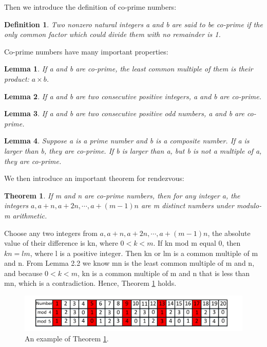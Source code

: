 \documentclass[10pt, conference, letterpaper]{IEEEtran}
\newtheorem{theorem}{Theorem}
\newtheorem{lemma}{Lemma}[section]
\newtheorem{definition}{Definition}[section]
\begin{document}
Then we introduce the definition of co-prime numbers:
\begin{definition}
Two nonzero natural integers a and b are said to be co-prime if the only common factor which could divide them with no remainder is 1.
\end{definition}

Co-prime numbers have many important properties:
\begin{lemma}
If a and b are co-prime, the least common multiple of them is their product: $a \times b$.
\end{lemma}
\begin{lemma}
If a and b are two consecutive positive integers, a and b are co-prime.
\end{lemma}
\begin{lemma}
If a and b are two consecutive positive odd numbers, a and b are co-prime.
\end{lemma}
\begin{lemma}
Suppose a is a prime number and b is a composite number. If a is larger than b, they are co-prime. If b is larger than a, but b is not a multiple of a, they are co-prime.
\end{lemma}

We then introduce an important theorem for rendezvous:
\begin{theorem}
\label{theo}
If m and n are co-prime numbers, then for any integer a, the integers $a, a + n, a + 2n,\cdots, a+(m-1)n$ are m distinct numbers under modulo-m arithmetic.
\end{theorem}
\begin{IEEEproof}
Choose any two integers from $a, a+n, a + 2n,\cdots, a+(m-1)n$, the absolute value of their difference is kn, where $0 < k < m$. If kn mod m equal 0, then $kn = lm$, where l is a positive integer. Then kn or lm is a common multiple of m and n. From Lemma 2.2 we know mn is the least common multiple of m and n, and because $0 < k < m$, kn is a common multiple of m and n that is less than mn, which is a contradiction. Hence, Theorem \ref{theo} holds.
\end{IEEEproof}

\begin{figure}[!t]
\centering
\includegraphics[width=1\columnwidth]{theo}
\caption{An example of Theorem \ref{theo}.}
\label{exp1}
\end{figure}
\end{document}

